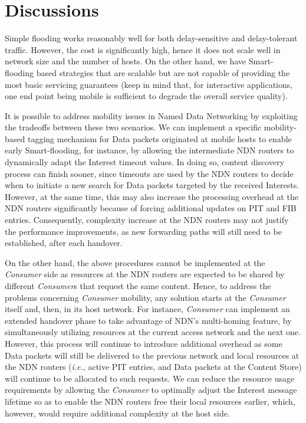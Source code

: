 \documentclass[conference]{IEEEtran}
\begin{document}
\section{Discussions}\label{Section:Discussions}

Simple flooding works reasonably well for both delay-sensitive and delay-tolerant traffic. However, the cost is significantly high, hence it does not scale well in network size and the number of hosts. On the other hand, we have Smart-flooding based strategies that are scalable but are not capable of providing the most basic servicing guarantees (keep in mind that, for interactive applications, one end point being mobile is sufficient to degrade the overall service quality).

It is possible to address mobility issues in Named Data Networking by exploiting the tradeoffs between these two scenarios. We can implement a specific mobility-based tagging mechanism for Data packets originated at mobile hosts to enable early Smart-flooding, for instance, by allowing the intermediate NDN routers to dynamically adapt the Interest timeout values. In doing so, content discovery process can finish sooner, since timeouts are used by the NDN routers to decide when to initiate a new search for Data packets targeted by the received Interests. However, at the same time, this may also increase the processing overhead at the NDN routers significantly because of forcing additional updates on PIT and FIB entries. Consequently, complexity increase at the NDN routers may not justify the performance improvements, as new forwarding paths will still need to be established, after each handover.

On the other hand, the above procedures cannot be implemented at the \emph{Consumer} side as resources at the NDN routers are expected to be shared by different \emph{Consumer}s that request the same content. Hence, to address the problems concerning \emph{Consumer} mobility, any solution starts at the \emph{Consumer} itself and, then, in its host network. For instance, \emph{Consumer} can implement an extended handover phase to take advantage of NDN's multi-homing feature, by simultaneously utilizing resources at the current access network and the next one. However, this process will continue to introduce additional overhead as some Data packets will still be delivered to the previous network and local resources at the NDN routers (\emph{i.e.}, active PIT entries, and Data packets at the Content Store) will continue to be allocated to such requests. We can reduce the resource usage requirements by allowing the \emph{Consumer} to optimally adjust the Interest message lifetime so as to enable the NDN routers free their local resources earlier, which, however, would require additional complexity at the host side.
\end{document}
